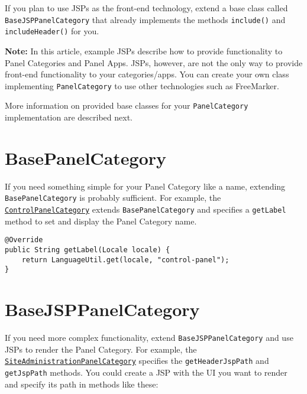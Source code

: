 If you plan to use JSPs as the front-end technology, extend a base class
called \texttt{BaseJSPPanelCategory} that already implements the methods
\texttt{include()} and \texttt{includeHeader()} for you.

\noindent\hrulefill

\textbf{Note:} In this article, example JSPs describe how to provide
functionality to Panel Categories and Panel Apps. JSPs, however, are not
the only way to provide front-end functionality to your categories/apps.
You can create your own class implementing \texttt{PanelCategory} to use
other technologies such as FreeMarker.

\noindent\hrulefill

More information on provided base classes for your
\texttt{PanelCategory} implementation are described next.

\section{BasePanelCategory}\label{basepanelcategory}

If you need something simple for your Panel Category like a name,
extending \texttt{BasePanelCategory} is probably sufficient. For
example, the
\href{https://github.com/liferay/liferay-portal/blob/7.2.0-ga1/modules/apps/product-navigation/product-navigation-control-panel/src/main/java/com/liferay/product/navigation/control/panel/internal/application/list/ControlPanelCategory.java}{\texttt{ControlPanelCategory}}
extends \texttt{BasePanelCategory} and specifies a \texttt{getLabel}
method to set and display the Panel Category name.

\begin{verbatim}
@Override
public String getLabel(Locale locale) {
    return LanguageUtil.get(locale, "control-panel");
}
\end{verbatim}

\section{BaseJSPPanelCategory}\label{basejsppanelcategory}

If you need more complex functionality, extend
\texttt{BaseJSPPanelCategory} and use JSPs to render the Panel Category.
For example, the
\href{https://github.com/liferay/liferay-portal/blob/7.2.0-ga1/modules/apps/product-navigation/product-navigation-site-administration/src/main/java/com/liferay/product/navigation/site/administration/internal/application/list/SiteAdministrationPanelCategory.java}{\texttt{SiteAdministrationPanelCategory}}
specifies the \texttt{getHeaderJspPath} and \texttt{getJspPath} methods.
You could create a JSP with the UI you want to render and specify its
path in methods like these:

